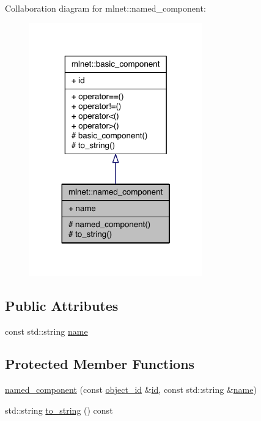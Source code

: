 Collaboration diagram for mlnet\+:\+:named\+\_\+component\+:\nopagebreak
\begin{figure}[H]
\begin{center}
\leavevmode
\includegraphics[width=212pt]{classmlnet_1_1named__component__coll__graph}
\end{center}
\end{figure}
\subsection*{Public Attributes}
\begin{DoxyCompactItemize}
\item 
const std\+::string \hyperlink{classmlnet_1_1named__component_a3015f6650729352abae8fb01e7ee7ca7}{name}
\end{DoxyCompactItemize}
\subsection*{Protected Member Functions}
\begin{DoxyCompactItemize}
\item 
\hyperlink{classmlnet_1_1named__component_a1333fc9ae4a272750e25f303ac619081}{named\+\_\+component} (const \hyperlink{namespacemlnet_a318fc9bfdb74e1da4d44d0c50d4a453d}{object\+\_\+id} \&\hyperlink{classmlnet_1_1basic__component_a7d56ea959ef686405bc0fa4830b03347}{id}, const std\+::string \&\hyperlink{classmlnet_1_1named__component_a3015f6650729352abae8fb01e7ee7ca7}{name})
\item 
std\+::string \hyperlink{classmlnet_1_1named__component_a46c630c6fe0ece5e8b3277ad3863112f}{to\+\_\+string} () const 
\end{DoxyCompactItemize}

